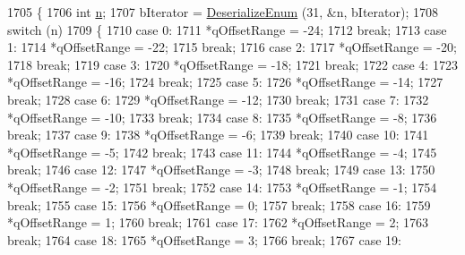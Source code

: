 \begin{DoxyCode}
1705 \{
1706   \textcolor{keywordtype}{int} \hyperlink{namespacesample-rng-plot_aeb5ee5c431e338ef39b7ac5431242e1d}{n};
1707   bIterator = \hyperlink{classns3_1_1Asn1Header_a4fcc253e0eec3483c775b005c1875f2d}{DeserializeEnum} (31, &n, bIterator);
1708   \textcolor{keywordflow}{switch} (n)
1709     \{
1710     \textcolor{keywordflow}{case} 0:
1711       *qOffsetRange = -24;
1712       \textcolor{keywordflow}{break};
1713     \textcolor{keywordflow}{case} 1:
1714       *qOffsetRange = -22;
1715       \textcolor{keywordflow}{break};
1716     \textcolor{keywordflow}{case} 2:
1717       *qOffsetRange = -20;
1718       \textcolor{keywordflow}{break};
1719     \textcolor{keywordflow}{case} 3:
1720       *qOffsetRange = -18;
1721       \textcolor{keywordflow}{break};
1722     \textcolor{keywordflow}{case} 4:
1723       *qOffsetRange = -16;
1724       \textcolor{keywordflow}{break};
1725     \textcolor{keywordflow}{case} 5:
1726       *qOffsetRange = -14;
1727       \textcolor{keywordflow}{break};
1728     \textcolor{keywordflow}{case} 6:
1729       *qOffsetRange = -12;
1730       \textcolor{keywordflow}{break};
1731     \textcolor{keywordflow}{case} 7:
1732       *qOffsetRange = -10;
1733       \textcolor{keywordflow}{break};
1734     \textcolor{keywordflow}{case} 8:
1735       *qOffsetRange = -8;
1736       \textcolor{keywordflow}{break};
1737     \textcolor{keywordflow}{case} 9:
1738       *qOffsetRange = -6;
1739       \textcolor{keywordflow}{break};
1740     \textcolor{keywordflow}{case} 10:
1741       *qOffsetRange = -5;
1742       \textcolor{keywordflow}{break};
1743     \textcolor{keywordflow}{case} 11:
1744       *qOffsetRange = -4;
1745       \textcolor{keywordflow}{break};
1746     \textcolor{keywordflow}{case} 12:
1747       *qOffsetRange = -3;
1748       \textcolor{keywordflow}{break};
1749     \textcolor{keywordflow}{case} 13:
1750       *qOffsetRange = -2;
1751       \textcolor{keywordflow}{break};
1752     \textcolor{keywordflow}{case} 14:
1753       *qOffsetRange = -1;
1754       \textcolor{keywordflow}{break};
1755     \textcolor{keywordflow}{case} 15:
1756       *qOffsetRange = 0;
1757       \textcolor{keywordflow}{break};
1758     \textcolor{keywordflow}{case} 16:
1759       *qOffsetRange = 1;
1760       \textcolor{keywordflow}{break};
1761     \textcolor{keywordflow}{case} 17:
1762       *qOffsetRange = 2;
1763       \textcolor{keywordflow}{break};
1764     \textcolor{keywordflow}{case} 18:
1765       *qOffsetRange = 3;
1766       \textcolor{keywordflow}{break};
1767     \textcolor{keywordflow}{case} 19:

\end{DoxyCode}
